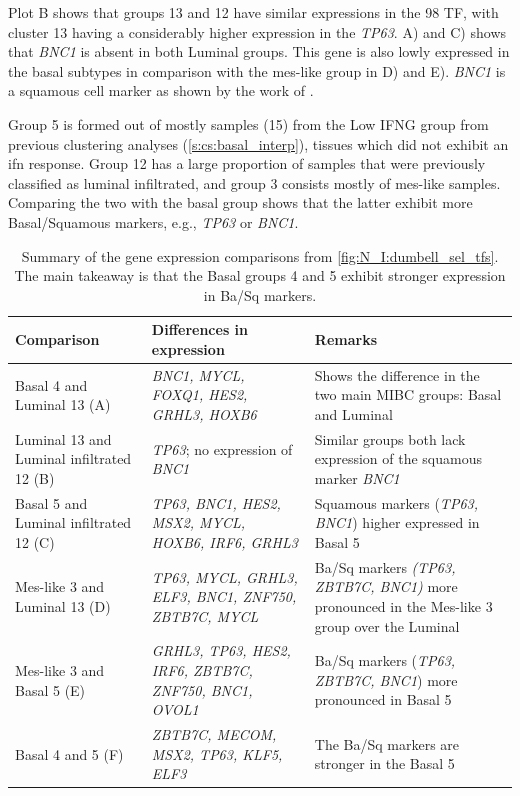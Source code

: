Plot B shows that groups 13 and 12 have similar expressions in the 98 TF, with cluster 13 having a considerably higher expression in the \textit{TP63}.  A) and C) shows that \textit{BNC1} is absent in both Luminal groups. This gene is also lowly expressed in the basal subtypes in comparison with the mes-like group in D) and E). \textit{BNC1} is a squamous cell marker as shown by the work of \citet{Hurst2022-sp}.

Group 5 is formed out of mostly samples (15) from the Low IFNG group from previous clustering analyses (\cref{s:cs:basal_interp}), tissues which did not exhibit an \acrlong{ifn} response. Group 12 has a large proportion of samples that were previously classified as luminal infiltrated, and group 3 consists mostly of mes-like samples. Comparing the two with the basal group shows that the latter exhibit more Basal/Squamous markers, e.g., \textit{TP63} or \textit{BNC1}.

\begin{table}[!t]
    \centering
    \scriptsize
    \begin{tabularx}{\textwidth}{>{\hsize=0.8\hsize}X|>{\hsize=0.8\hsize}X|>{\hsize=1.4\hsize}X}
        \toprule
        \textbf{Comparison} & \textbf{Differences in expression} & \textbf{Remarks} \\
        \midrule
        Basal 4 and Luminal 13 (A) & \textit{BNC1, MYCL, FOXQ1, HES2, GRHL3, HOXB6} & Shows the difference in the two main MIBC groups: Basal and Luminal \\
        \midrule
        Luminal 13 and Luminal infiltrated 12 (B) & \textit{TP63}; no expression of \textit{BNC1} & Similar groups both lack expression of the squamous marker \textit{BNC1} \\
        \midrule
        Basal 5 and Luminal infiltrated 12 (C) & \textit{TP63, BNC1, HES2, MSX2, MYCL, HOXB6, IRF6, GRHL3} & Squamous markers (\textit{TP63, BNC1}) higher expressed in Basal 5 \\
        \midrule
        Mes-like 3 and Luminal 13 (D) & \textit{TP63, MYCL, GRHL3, ELF3, BNC1, ZNF750, ZBTB7C, MYCL} & Ba/Sq markers \textit{(TP63, ZBTB7C, BNC1)} more pronounced in the Mes-like 3 group over the Luminal \\
        \midrule
        Mes-like 3 and  Basal 5 (E) & \textit{GRHL3, TP63, HES2, IRF6, ZBTB7C, ZNF750, BNC1, OVOL1} & Ba/Sq markers (\textit{TP63, ZBTB7C, BNC1}) more pronounced in Basal 5 \\
        \midrule
        Basal 4 and 5 (F) & \textit{ZBTB7C, MECOM, MSX2, TP63, KLF5, ELF3} & The Ba/Sq markers are stronger in the Basal 5 \\
        \bottomrule
    \end{tabularx}
    \caption[98 TFs: Summary of the gene expressions across the new MIBC]{Summary of the gene expression comparisons from \cref{fig:N_I:dumbell_sel_tfs}. The main takeaway is that the Basal groups 4 and 5 exhibit stronger expression in Ba/Sq markers.}
    \label{tab:N_I:dumbel_summarry}
\end{table}

